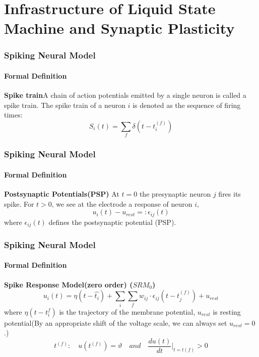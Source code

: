 \documentclass[10pt,aspectratio=43,mathserif, notes]{beamer}
\begin{document}
\section[Infrastructure]{Infrastructure of Liquid State Machine and Synaptic Plasticity}
		\begin{frame}
		    \frametitle{\textbf{Spiking Neural Model}}
            \framesubtitle{Formal Definition}
            \begin{block}{\textbf{Spike train}}A chain of action potentials emitted by a single neuron is called a spike train. The spike train of a neuron $i$ is denoted as the sequence of firing times:
            \begin{equation}
                S_i(t) = \sum \limits_{f}\delta(t - t_i^{(f)})
            \end{equation}
            \end{block}
        \end{frame}
		\begin{frame}
		    \frametitle{\textbf{Spiking Neural Model}}
            \framesubtitle{Formal Definition}
            \begin{block}{\textbf{Postsynaptic Potentials(PSP)}}
            At $t=0$ the presynaptic neuron $j$ fires its spike. For $t>0$, we see at the electrode a response of neuron $i$,
            \begin{equation}
                u_i(t) - u_{rest} =: \epsilon_{ij}(t)
            \end{equation}
            where $\epsilon_{ij}(t)$ defines the postsynaptic potential (PSP).
            \end{block}
		\end{frame}
		\begin{frame}
            \frametitle{\textbf{Spiking Neural Model}}
            \framesubtitle{Formal Definition}
		    \begin{block}{\textbf{Spike Response Model(zero order) ($SRM_0$)}}
            \begin{equation}
                u_i(t) = \eta(t-\hat{t_i}) + \sum \limits_{i}\sum \limits_{f}w_{ij}\cdot\epsilon_{ij}(t - t_j^{(f)}) + u_{rest}
            \end{equation}
            where $\eta(t-t_i^{f})$ is the trajectory of the membrane potential, $u_{rest}$ is resting potential(By an appropriate shift of the voltage scale, we can always set $u_{rest}=0$.)
            \begin{equation}
            \label{FSNM}
                t^{(f)}: \quad u(t^{(f)})=\vartheta \quad and \quad \frac {du(t)}{dt}\big|_{t=t(f)}>0
            \end{equation}
            \end{block}
		\end{frame}
\end{document}
